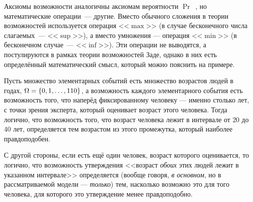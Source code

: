 Аксиомы возможности аналогичны аксиомам вероятности $\Pr$~\cite{kolmogorov}, но математические операции~--- другие. Вместо обычного сложения в теории возможностей используется операция <<$\max$>> (в случае бесконечного числа слагаемых~--- <<$\sup$>>), а вместо умножения --- операция <<$\min$>> (в бесконечном случае~--- <<$\inf$>>). Эти операции не выводятся, а постулируются в рамках теории возможностей Заде, однако в них есть определённый математический смысл, который можно пояснить на примере.
\begin{example}
Пусть множество элементарных событий есть множество возрастов людей в годах, $\Omega = \{0, 1, \ldots, 110\}$, а возможность каждого элементарного события есть возможность того, что наперёд фиксированному человеку --- именно столько лет, с точки зрения эксперта, который оценивает возраст этого человека.  Тогда логично, что возможность того, что возраст человека лежит в интервале от $20$ до $40$ лет, определяется тем возрастом из этого промежутка, который наиболее правдоподобен. 

С другой стороны, если есть ещё один человек, возраст которого оценивается, то логично, что возможность утверждения <<возраст {\sl обоих} этих людей лежит в указанном интервале>> определяется (вообще говоря, {\sl в основном}, но в рассматриваемой модели --- {\sl только}) тем, насколько возможно это для того человека, для которого это утверждение менее правдоподобно. 
\end{example}


